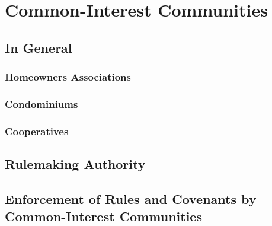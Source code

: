 \chapter{Common-Interest Communities}


\section{In General}



\subsection{Homeowners Associations}




\subsection{Condominiums}




\subsection{Cooperatives}





\section{Rulemaking Authority}





\begin{questions}

\end{questions}






\begin{questions}

\end{questions}

\section{Enforcement of Rules and Covenants by Common-Interest Communities}







\begin{questions}

\end{questions}
